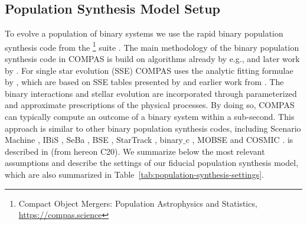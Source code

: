 \documentclass[twocolumn]{aastex63}
\newcommand{\floor}[1]{\textbf{\textcolor{magenta}{[Floor: #1]}}}
\newcommand\COMPAS{{\sc{COMPAS }}}
\newcommand{\CMP}{C20}
\begin{document}
\subsection{Population Synthesis  Model Setup}
\label{subsec:method-BPS-assumptions}
%
To evolve a population of binary systems we use the rapid binary population synthesis code from the {}\footnote{Compact Object Mergers: Population Astrophysics and Statistics,  \url{https://compas.science}} suite \citep{stevenson2017formation, 2018MNRAS.477.4685B, 2018MNRAS.481.4009V, 2019MNRAS.490.3740N, 2019MNRAS.490.5228B}. 
The main methodology of the binary population synthesis code  in COMPAS is build on  algorithms already by e.g., \citealt{1985MNRAS.214..357W, 1987ApJ...321..780D, 1987SvA....31..228L} and later work by \citet{1997MNRAS.291..732T}. For single star evolution (SSE) COMPAS uses the analytic fitting formulae by \citet{2000MNRAS.315..543H,2002MNRAS.329..897H}, which are based on SSE tables presented by \citet{1998IAUS..191P.607P} and earlier work from  \citet{1989ApJ...347..998E,1996MNRAS.281..257T}. The binary interactions and stellar evolution are  incorporated through parameterized  and approximate prescriptions of the physical processes. By doing so, COMPAS can typically compute an outcome of a binary system within a sub-second.  
This approach is similar to other binary population synthesis codes, including  Scenario Machine \citep{1996ApJ...466..234L,1996A&A...310..489L,2009ARep...53..915L}, IBiS \citep{1996MNRAS.280.1035T}, SeBa \citep{1996A&A...309..179P,1998A&A...332..173P,2001A&A...365..491N,2012A&A...546A..70T},  BSE \citep{2002MNRAS.329..897H}, StarTrack \citep{2002ApJ...572..407B,2008ApJS..174..223B},  binary$\_$c \citep{2004MNRAS.350..407I,2006A&A...460..565I,2009A&A...508.1359I},  MOBSE \citep{2018MNRAS.474.2959G,2018MNRAS.480.2011G}  and COSMIC \citep{2019arXiv191100903B}. 
{\COMPAS} is described in \citet{2020COMPASprep} (from hereon \CMP).  We summarize below the most relevant assumptions and describe the settings of our fiducial population synthesis model, which are also summarized in Table~\ref{tab:population-synthesis-settings}.
\end{document}

